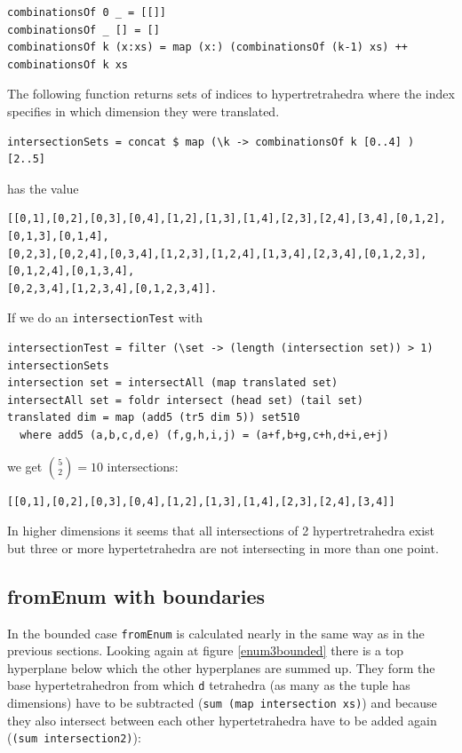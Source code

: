 \documentclass{tmr}
\begin{document}
\begin{Verbatim}
combinationsOf 0 _ = [[]]
combinationsOf _ [] = []
combinationsOf k (x:xs) = map (x:) (combinationsOf (k-1) xs) ++ combinationsOf k xs
\end{Verbatim}

The following function returns sets of indices to hypertretrahedra where the index specifies in which dimension they were translated.

\begin{Verbatim}
intersectionSets = concat $ map (\k -> combinationsOf k [0..4] ) [2..5]
\end{Verbatim}

has the value

\begin{Verbatim}
[[0,1],[0,2],[0,3],[0,4],[1,2],[1,3],[1,4],[2,3],[2,4],[3,4],[0,1,2],[0,1,3],[0,1,4],
[0,2,3],[0,2,4],[0,3,4],[1,2,3],[1,2,4],[1,3,4],[2,3,4],[0,1,2,3],[0,1,2,4],[0,1,3,4],
[0,2,3,4],[1,2,3,4],[0,1,2,3,4]].
\end{Verbatim}

If we do an \verb|intersectionTest| with
\begin{Verbatim}
intersectionTest = filter (\set -> (length (intersection set)) > 1) intersectionSets
intersection set = intersectAll (map translated set)
intersectAll set = foldr intersect (head set) (tail set)
translated dim = map (add5 (tr5 dim 5)) set510
  where add5 (a,b,c,d,e) (f,g,h,i,j) = (a+f,b+g,c+h,d+i,e+j)
\end{Verbatim}
we get $\binom{5}{2} = 10$ intersections:

\begin{Verbatim}
[[0,1],[0,2],[0,3],[0,4],[1,2],[1,3],[1,4],[2,3],[2,4],[3,4]]
\end{Verbatim}

In higher dimensions it seems that all intersections of 2 hypertretrahedra exist but three or more hypertetrahedra are not intersecting in more than one point.

\subsection{fromEnum with boundaries}
In the bounded case \verb|fromEnum| is calculated nearly in the same way as in the previous sections. Looking again at figure \ref{enum3bounded} there is a top hyperplane below which the other hyperplanes are summed up. They form the base hypertetrahedron from which \verb|d| tetrahedra (as many as the tuple has dimensions) have to be subtracted (\verb|sum (map intersection xs)|) and because they also intersect between each other hypertetrahedra have to be added again (\verb|(sum intersection2)|):
\end{document}

